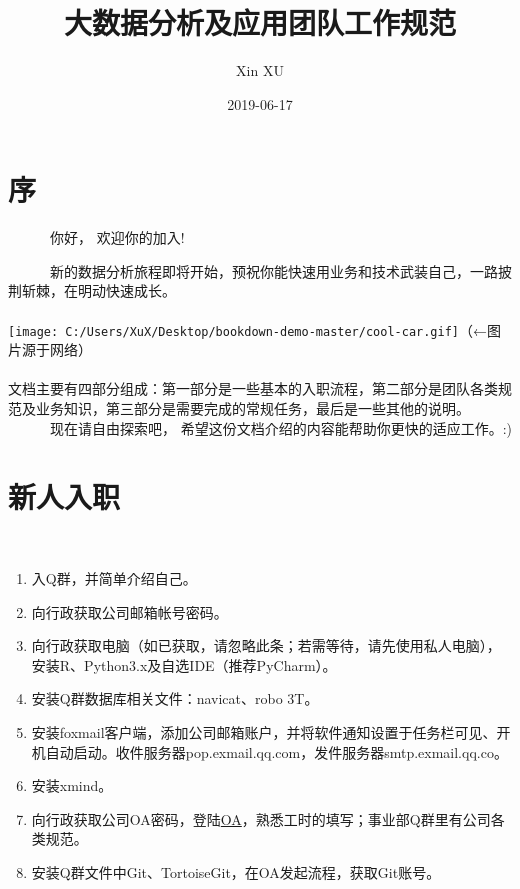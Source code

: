 \documentclass[]{book}
\title{大数据分析及应用团队工作规范}
\author{Xin XU}
\date{2019-06-17}
\begin{document}
\maketitle

{
\setcounter{tocdepth}{1}
\tableofcontents
}
\hypertarget{section}{%
\chapter{序}\label{section}}

~~~~~~你好， 欢迎你的加入!

~~~~~~新的数据分析旅程即将开始，预祝你能快速用业务和技术武装自己，一路披荆斩棘，在明动快速成长。\\
~\\
\hspace*{0.333em}\hspace*{0.333em}\hspace*{0.333em}\hspace*{0.333em}\hspace*{0.333em}\hspace*{0.333em}\texttt{[image: C:/Users/XuX/Desktop/bookdown-demo-master/cool-car.gif]}（←图片源于网络）\\
~\\
\hspace*{0.333em}\hspace*{0.333em}\hspace*{0.333em}\hspace*{0.333em}\hspace*{0.333em}\hspace*{0.333em}文档主要有四部分组成：第一部分是一些基本的入职流程，第二部分是团队各类规范及业务知识，第三部分是需要完成的常规任务，最后是一些其他的说明。\\
~~~~~~现在请自由探索吧， 希望这份文档介绍的内容能帮助你更快的适应工作。:)

\hypertarget{intro}{%
\chapter{新人入职}\label{intro}}

~~~~~~

\begin{enumerate}
\def\labelenumi{\arabic{enumi}.}
\item
  入Q群，并简单介绍自己。
\item
  向行政获取公司邮箱帐号密码。
\item
  向行政获取电脑（如已获取，请忽略此条；若需等待，请先使用私人电脑），安装R、Python3.x及自选IDE（推荐PyCharm）。
\item
  安装Q群数据库相关文件：navicat、robo 3T。
\item
  安装foxmail客户端，添加公司邮箱账户，并将软件通知设置于任务栏可见、开机自动启动。收件服务器pop.exmail.qq.com，发件服务器smtp.exmail.qq.co。
\item
  安装xmind。
\item
  向行政获取公司OA密码，登陆\href{http://192.168.0.212/instance-web/minstone/login}{OA}，熟悉工时的填写；事业部Q群里有公司各类规范。
\item
  安装Q群文件中Git、TortoiseGit，在OA发起流程，获取Git账号。
\end{enumerate}
\end{document}
